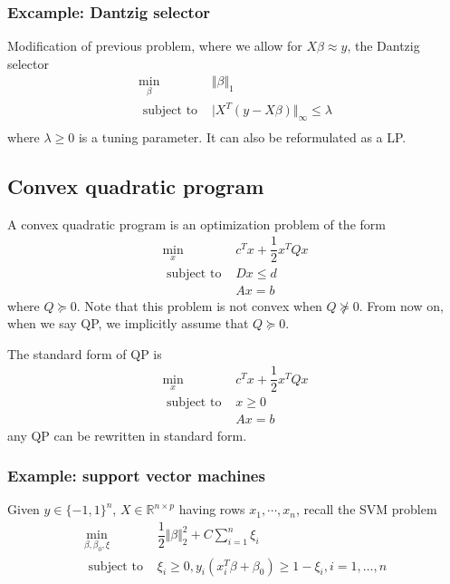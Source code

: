 \documentclass[a4paper]{article}
\begin{document}
{\subsubsection{Excample: Dantzig selector}
Modification of previous problem, where we allow for $X \beta \approx y$, the Dantzig selector
\begin{equation}
  \begin{array}{ll}
    \min\limits_{\beta} & \Vert \beta \Vert_1  \\ \nonumber
    \text { subject to } & \vert X^T (y-X \beta)\Vert_\infty \leq \lambda \\ \nonumber
\end{array} 
\end{equation}
where $\lambda \geq 0$ is a tuning parameter. It can also be reformulated as a 
LP.

\subsection{Convex quadratic program}
\begin{defi}
  A convex quadratic program is an optimization problem of the form
  \[
  \begin{array}{ll}
      \min\limits_{x} & c^T x + \dfrac{1}{2}x^T Qx \\
      \text { subject to } & Dx \leq d \\ \nonumber
      & Ax = b
  \end{array} 
  \]
  where $Q \succeq  0$. Note that this problem is not convex when $Q \nsucceq 0$. From now on, when we say QP, we implicitly assume that $Q \succeq 0$.
\end{defi}

\noindent The standard form of QP is 
\begin{equation}
  \begin{array}{ll}
    \min\limits_{x} & c^T x + \dfrac{1}{2}x^T Qx \\
    \text { subject to } & x \geq 0 \\ \nonumber
    & Ax = b
\end{array} 
\end{equation}
any QP can be rewritten in standard form.

\subsubsection{Example: support vector machines}
Given $y \in \{-1, 1\}^n$, $X \in \mathbb{R}^{n \times p}$ having rows $x_1, \cdots, x_n$, recall the SVM problem
\begin{equation}
  \begin{array}{ll}
    \min\limits_{\beta, \beta_{0}, \xi} & \dfrac{1}{2}\Vert\beta\Vert_{2}^{2}+C \sum\limits_{i=1}^{n} \xi_{i} \\\text { subject to } & \xi_{i} \geq 0, y_{i}\left(x_{i}^{T} \beta+\beta_{0}\right) \geq 1-\xi_{i}, i=1, \ldots, n \nonumber
  \end{array}
\end{equation}

}
\end{document}
